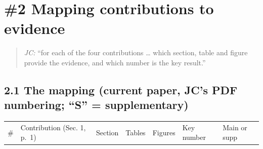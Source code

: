 \documentclass[
  10pt,
]{article}
\newcounter{none} %
\begin{document}
\section{\#2 Mapping contributions to evidence}

\begin{quote}
\emph{JC:} ``for each of the four contributions \ldots{} which section,
table and figure provide the evidence, and which number is the key
result.''
\end{quote}

\subsection{2.1 The mapping (current paper, JC's PDF numbering; ``S'' =
supplementary)}

{\def\LTcaptype{none} %
\begin{longtable}[]{@{}
  >{\raggedright\arraybackslash}p{}
  >{\raggedright\arraybackslash}p{}
  >{\raggedright\arraybackslash}p{}
  >{\raggedright\arraybackslash}p{}
  >{\raggedright\arraybackslash}p{}
  >{\raggedright\arraybackslash}p{}
  >{\raggedright\arraybackslash}p{}@{}}
\toprule\noalign{}
\begin{minipage}[b]{\linewidth}\raggedright
\#
\end{minipage} & \begin{minipage}[b]{\linewidth}\raggedright
Contribution (Sec. 1, p.~1)
\end{minipage} & \begin{minipage}[b]{\linewidth}\raggedright
Section
\end{minipage} & \begin{minipage}[b]{\linewidth}\raggedright
Tables
\end{minipage} & \begin{minipage}[b]{\linewidth}\raggedright
Figures
\end{minipage} & \begin{minipage}[b]{\linewidth}\raggedright
Key number
\end{minipage} & \begin{minipage}[b]{\linewidth}\raggedright
Main or supp
\end{minipage} \\

\end{longtable}}
\end{document}
